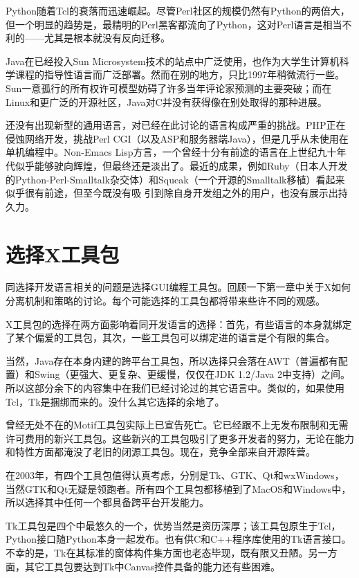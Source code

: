 \documentclass[12pt,oneside]{book}
\begin{document}
Python随着Tcl的衰落而迅速崛起。尽管Perl社区的规模仍然有Python的两倍大，但一个明显的趋势是，最精明的Perl黑客都流向了Python，这对Perl语言是相当不利的——尤其是根本就没有反向迁移。

Java在已经投入Sun Microsystem技术的站点中广泛使用，也作为大学生计算机科学课程的指导性语言而广泛部署。然而在别的地方，只比1997年稍微流行一些。Sun一意孤行的所有权许可模型妨碍了许多当年评论家预测的主要突破；而在Linux和更广泛的开源社区，Java对C并没有获得像在别处取得的那种进展。

还没有出现新型的通用语言，对已经在此讨论的语言构成严重的挑战。PHP正在侵蚀网络开发，挑战Perl CGI（以及ASP和服务器端Java），但是几乎从未使用在单机编程中。Non-Emacs Lisp方言，一个曾经十分有前途的语言在上世纪九十年代似乎能够驶向辉煌，但最终还是淡出了。最近的成果，例如Ruby（日本人开发的Python-Perl-Smalltalk杂交体）和Squeak（一个开源的Smalltalk移植）看起来似乎很有前途，但至今既没有吸
引到除自身开发组之外的用户，也没有展示出持久力。


\section{选择X工具包}
同选择开发语言相关的问题是选择GUI编程工具包。回顾一下第一章中关于X如何分离机制和策略的讨论。每个可能选择的工具包都将带来些许不同的观感。

X工具包的选择在两方面影响着同开发语言的选择：首先，有些语言的本身就绑定了某个偏爱的工具包，其次，一些工具包可以绑定进的语言是个有限的集合。

当然，Java存在本身内建的跨平台工具包，所以选择只会落在AWT（普遍都有配置）和Swing（更强大、更复杂、更缓慢，仅仅在JDK 1.2/Java 2中支持）之间。所以这部分余下的内容集中在我们已经讨论过的其它语言中。类似的，如果使用Tcl，Tk是捆绑而来的。没什么其它选择的余地了。

曾经无处不在的Motif工具包实际上已宣告死亡。它已经跟不上无发布限制和无需许可费用的新兴工具包。这些新兴的工具包吸引了更多开发者的努力，无论在能力和特性方面都淹没了老旧的闭源工具包。现在，竞争全部来自开源阵营。

在2003年，有四个工具包值得认真考虑，分别是Tk、GTK、Qt和wxWindows，  当然GTK和Qt无疑是领跑者。所有四个工具包都移植到了MacOS和Windows中，所以选择其中任何一个都具备跨平台开发能力。

Tk工具包是四个中最悠久的一个，优势当然是资历深厚；该工具包原生于Tcl，Python接口随Python本身一起发布。也有供C和C++程序库使用的Tk语言接口。不幸的是，Tk在其标准的窗体构件集方面也老态毕现，既有限又丑陋。另一方面，其它工具包要达到Tk中Canvas控件具备的能力还有些困难。
\end{document}
